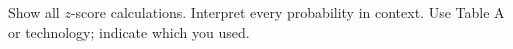 \documentclass[10pt]{article}
\begin{document}

\vspace{0.10in}

\begin{tcolorbox}[colback=sky, colframe=navy, boxrule=0.8pt, arc=2mm,
    left=3mm, right=3mm, top=1.5mm, bottom=1.5mm]
\small Show all $z$-score calculations. Interpret every probability in context.
Use Table A or technology; indicate which you used.
\end{tcolorbox}

\vspace{0.12in}

\boxguard
\end{document}
